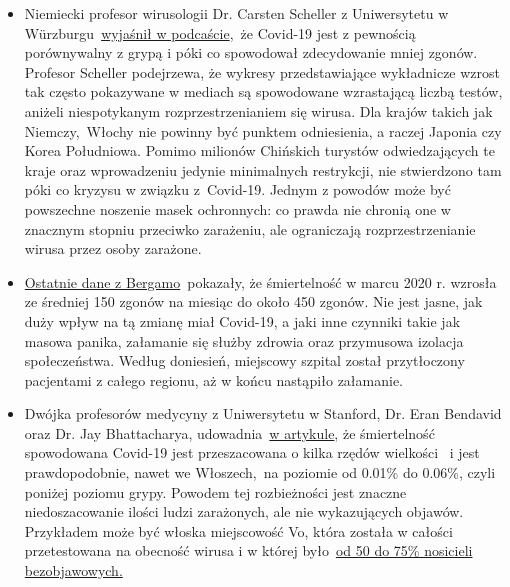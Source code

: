 \begin{itemize}
\tightlist
\item
  Niemiecki profesor wirusologii Dr. Carsten Scheller z Uniwersytetu w
  Würzburgu~\href{https://www.youtube.com/watch?v=w-uub0urNfw}{wyjaśnił
  w podcaście},~że Covid-19 jest z pewnością porównywalny z grypą i póki
  co spowodował zdecydowanie mniej zgonów. Profesor Scheller podejrzewa,
  że wykresy przedstawiające wykładnicze wzrost tak często pokazywane w
  mediach są spowodowane wzrastającą liczbą testów, aniżeli
  niespotykanym rozprzestrzenianiem się wirusa. Dla krajów takich jak
  Niemczy,~Włochy nie powinny być punktem odniesienia, a raczej Japonia
  czy Korea Południowa. Pomimo milionów Chińskich turystów
  odwiedzających te kraje oraz wprowadzeniu jedynie minimalnych
  restrykcji, nie stwierdzono tam póki co kryzysu w związku z~Covid-19.
  Jednym z powodów może być powszechne noszenie masek ochronnych: co
  prawda nie chronią one w znacznym stopniu przeciwko zarażeniu, ale
  ograniczają rozprzestrzenianie wirusa przez osoby zarażone.
\item
  \href{https://www.ecodibergamo.it/stories/bergamo-citta/a-bergamo-decessi-4-volte-oltre-la-medialeco-lancia-unindagine-nei-comuni_1346651_11/}{Ostatnie
  dane z Bergamo}~pokazały, że śmiertelność w marcu 2020 r. wzrosła ze
  średniej 150 zgonów na miesiąc do około 450 zgonów. Nie jest jasne,
  jak duży wpływ na tą zmianę miał Covid-19, a jaki inne czynniki takie
  jak masowa panika, załamanie się służby zdrowia oraz przymusowa
  izolacja społeczeństwa. Według doniesień, miejscowy szpital został
  przytłoczony pacjentami z całego regionu, aż w końcu nastąpiło
  załamanie.
\item
  Dwójka profesorów medycyny z Uniwersytetu w Stanford, Dr. Eran
  Bendavid oraz Dr. Jay Bhattacharya,
  udowadnia~\href{https://web.archive.org/web/20200325103650/https://www.wsj.com/articles/is-the-coronavirus-as-deadly-as-they-say-11585088464}{w
  artykule}, że śmiertelność spowodowana Covid-19 jest przeszacowana o
  kilka rzędów wielkości~ i jest prawdopodobnie, nawet we Włoszech,~na
  poziomie od 0.01\% do 0.06\%, czyli poniżej poziomu grypy. Powodem tej
  rozbieżności jest znaczne niedoszacowanie ilości ludzi zarażonych, ale
  nie wykazujących objawów. Przykładem może być włoska miejscowość Vo,
  która została w całości przetestowana na obecność wirusa i w której
  było~\href{https://www.repubblica.it/salute/medicina-e-ricerca/2020/03/16/news/coronavirus_studio_il_50-75_dei_casi_a_vo_sono_asintomatici_e_molto_contagiosi-251474302/}{od
  50 do 75\% nosicieli bezobjawowych.}

\end{itemize}
